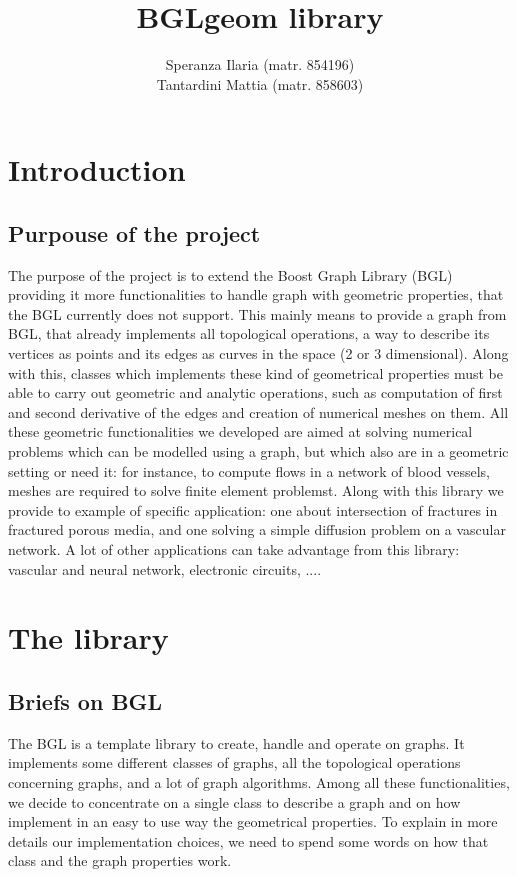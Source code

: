 \documentclass[11pt]{article} %
\title{BGLgeom library}
\author{Speranza Ilaria (matr. 854196) \\ Tantardini Mattia (matr. 858603)}
\begin{document}
\maketitle
\newpage
\tableofcontents
\newpage

\section{Introduction}
	\subsection{Purpouse of the project}	%
	The purpose of the project is to extend the Boost Graph Library (BGL) providing it more functionalities to handle graph with geometric properties, that the BGL currently does not support. This mainly means to provide a graph from BGL, that already implements all topological operations, a way to describe its vertices as points and its edges as curves in the space (2 or 3 dimensional). Along with this, classes which implements these kind of geometrical properties must be able to carry out geometric and analytic operations, such as computation of first and second derivative of the edges and creation of numerical meshes on them. \newline
	All these geometric functionalities we developed are aimed at solving numerical problems which can be modelled using a graph, but which also are in a geometric setting or need it: for instance, to compute flows in a network of blood vessels, meshes are required to solve finite element problemst. \newline
	Along with this library we provide to example of specific application: one about intersection of fractures in fractured porous media, and one solving a simple diffusion problem on a vascular network. \newline
	A lot of other applications can take advantage from this library: vascular and neural network, electronic circuits, .... 


\section{The library}
	\subsection{Briefs on BGL}
	The BGL is a template library to create, handle and operate on graphs. It implements some different classes of graphs, all the topological operations concerning graphs, and a lot of graph algorithms.
	\newline\newline
	Among all these functionalities, we decide to concentrate on a single class to describe a graph and on how implement in an easy to use way the geometrical properties. To explain in more details our implementation choices, we need to spend some words on how that class and the graph properties work.
	
\end{document}
